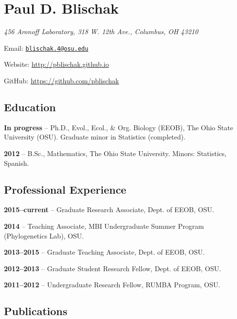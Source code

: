 \documentclass[]{article}
\title{}
\author{}
\date{}
\begin{document}

\section{\texorpdfstring{\textbf{Paul D.
Blischak}}{Paul D. Blischak}}\label{paul-d.-blischak}

\emph{456 Aronoff Laboratory, 318 W. 12th Ave., Columbus, OH 43210}

Email: \href{mailto:blischak.4@osu.edu}{\nolinkurl{blischak.4@osu.edu}}

Website:
\href{http://pblischak.github.io}{\url{http://pblischak.github.io}}

GitHub:
\href{https://github.com/pblischak}{\url{https://github.com/pblischak}}

\subsection{\texorpdfstring{\textbf{Education}}{Education}}\label{education}

\textbf{In progress} -- Ph.D., Evol., Ecol., \& Org. Biology (EEOB), The
Ohio State University (OSU). Graduate minor in Statistics (completed).

\textbf{2012} -- B.Sc., Mathematics, The Ohio State University. Minors:
Statistics, Spanish.

\subsection{\texorpdfstring{\textbf{Professional
Experience}}{Professional Experience}}\label{professional-experience}

\textbf{2015--current} -- Graduate Research Associate, Dept. of EEOB,
OSU.

\textbf{2014} -- Teaching Associate, MBI Undergraduate Summer Program
(Phylogenetics Lab), OSU.

\textbf{2013--2015} -- Graduate Teaching Associate, Dept. of EEOB, OSU.

\textbf{2012--2013} -- Graduate Student Research Fellow, Dept. of EEOB, OSU.

\textbf{2011--2012} -- Undergraduate Research Fellow, RUMBA Program,
OSU.

\subsection{\texorpdfstring{\textbf{Publications}}{Publications}}\label{publications}
\end{document}
